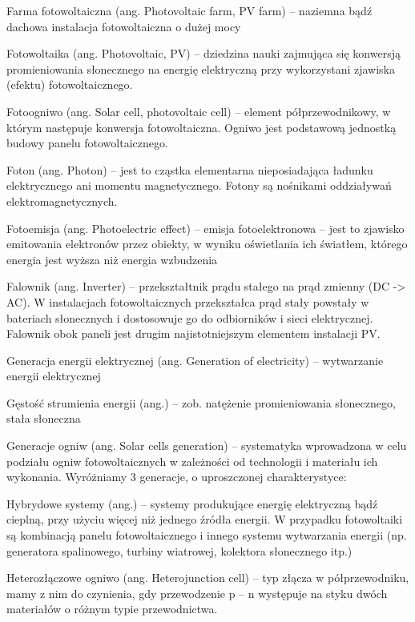 \documentclass[12pt,a4paper]{article}
\begin{document}
Farma fotowoltaiczna (ang. Photovoltaic farm, PV farm) – naziemna bądź dachowa instalacja fotowoltaiczna o dużej mocy

Fotowoltaika (ang. Photovoltaic, PV) – dziedzina nauki zajmująca się konwersją promieniowania słonecznego na energię elektryczną przy wykorzystani zjawiska (efektu) fotowoltaicznego.

Fotoogniwo (ang. Solar cell, photovoltaic cell) – element półprzewodnikowy, w którym następuje konwersja fotowoltaiczna. Ogniwo jest podstawową jednostką budowy panelu fotowoltaicznego.

Foton (ang. Photon) – jest to cząstka elementarna nieposiadająca ładunku elektrycznego ani momentu magnetycznego. Fotony są nośnikami oddziaływań elektromagnetycznych.

Fotoemisja (ang. Photoelectric effect) – emisja fotoelektronowa – jest to zjawisko emitowania elektronów przez obiekty, w wyniku oświetlania ich światłem, którego energia jest wyższa niż energia wzbudzenia

Falownik (ang. Inverter) \label{falownik} – przekształtnik prądu stałego na prąd zmienny (DC -> AC). W instalacjach fotowoltaicznych przekształca prąd stały powstały w bateriach słonecznych i dostosowuje go do odbiorników i sieci elektrycznej. Falownik obok paneli jest drugim najistotniejszym elementem instalacji PV.

Generacja energii elektrycznej (ang. Generation of electricity) – wytwarzanie energii elektrycznej

Gęstość strumienia energii (ang.) – zob. natężenie promieniowania słonecznego, stała słoneczna

Generacje ogniw (ang. Solar cells generation) – systematyka wprowadzona w celu podziału ogniw fotowoltaicznych w zależności od technologii i materiału ich  wykonania. Wyróżniamy 3 generacje, o uproszczonej charakterystyce:


Hybrydowe systemy (ang.) – systemy produkujące energię elektryczną bądź cieplną, przy użyciu więcej niż jednego źródła energii. W przypadku fotowoltaiki są kombinacją panelu fotowoltaicznego i innego systemu wytwarzania energii (np. generatora spalinowego, turbiny wiatrowej, kolektora słonecznego itp.)

Heterozłączowe ogniwo (ang. Heterojunction cell) – typ złącza w półprzewodniku, mamy z nim do czynienia, gdy przewodzenie p – n występuje na styku dwóch materiałów o różnym typie przewodnictwa.
\end{document}
